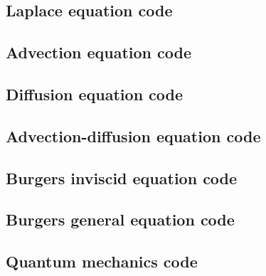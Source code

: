 \documentclass[twocolumn]{myarticle}
\begin{document}
\subsection{Laplace equation code}
\label{subsec:laplace_equation_code}


\vspace{10pt}

\subsection{Advection equation code}
\label{subsec:advection_equation_code}


\vspace{10pt}

\subsection{Diffusion equation code}
\label{subsec:diffusion_equation_code}


\vspace{10pt}

\subsection{Advection-diffusion equation code}
\label{subsec:advection_diffusion_equation_code}


\vspace{10pt}

\subsection{Burgers inviscid equation code}
\label{subsec:burgers_inviscid_equation_code}


\vspace{10pt}

\subsection{Burgers general equation code}
\label{subsec:burgers_general_equation_code}


\vspace{10pt}

\subsection{Quantum mechanics code}
\label{subsec:quantum_mechanics_code}
\end{document}
